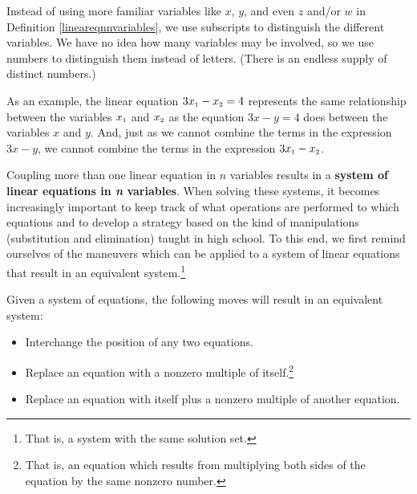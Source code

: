\smallskip

Instead of using more familiar variables like $x$, $y$, and even $z$ and/or $w$ in Definition \ref{lineareqnnvariables}, we use subscripts to distinguish the different variables.  We have no idea how many variables may be involved, so we use numbers to distinguish them instead of letters.  (There is an endless supply of distinct numbers.)  

As an example, the linear equation $3x_{\mbox{\tiny $1$}} - x_{\mbox{\tiny $2$}} = 4$ represents the same relationship between the variables $x_{\mbox{\tiny $1$}}$ and $x_{\mbox{\tiny $2$}}$  as the equation $3x-y=4$ does between the variables $x$ and $y$.  And, just as we cannot combine the terms in the expression $3x-y$, we cannot combine the terms in the expression $3x_{\mbox{\tiny $1$}} - x_{\mbox{\tiny $2$}}$.  

Coupling more than one linear equation in $n$ variables results in a \textbf{system of linear equations in \textit{n} variables}.  When solving these systems, it becomes increasingly important to keep track of what operations are performed to which equations and to develop a strategy based on the kind of manipulations (substitution and elimination) taught in high school.  To this end, we first remind ourselves of the maneuvers which can be applied to a system of linear equations that result in an equivalent system.\footnote{That is, a system with the same solution set.}  

\smallskip

\colorbox{ResultColor}{\bbm

\begin{thm}  \label{equationmoves} Given a system of equations, the following moves will result in an equivalent system:

\begin{itemize}

\item  Interchange the position of any two equations.

\item  Replace an equation with a nonzero multiple of itself.\footnote{That is, an equation which results from multiplying both sides of the equation by the same nonzero number.}

\item  Replace an equation with itself plus a nonzero multiple of another equation.


\end{itemize}

\end{thm}  

\ebm}

